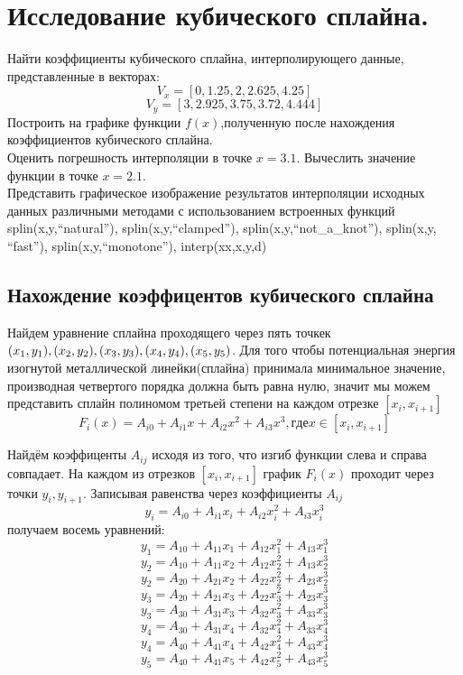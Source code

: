 \documentclass[russian,utf8,nocolumnxxxi,nocolumnxxxii]{eskdtext}
\begin{document}

\newpage
\section{Исследование кубического сплайна.}


\normalsize Найти коэффициенты кубического сплайна, интерполирующего данные, представленные в векторах:\\
$$V_{x}=[0,1.25,2,2.625,4.25]$$ 
$$V_{y}=[3,2.925,3.75,3.72,4.444]$$
Построить на графике функции $f(x)$,полученную после нахождения коэффициентов кубического сплайна. 
\\Оценить погрешность интерполяции в точке $x=3.1$. Вычеслить значение функции в точке $x=2.1$.
\\Представить графическое изображение результатов интерполяции исходных данных различными методами с использованием встроенных функций\\ splin(x,y,“natural”), splin(x,y,“clamped”), splin(x,y,“not\_a\_knot”), splin(x,y, “fast”), splin(x,y,“monotone”), interp(xx,x,y,d)

\subsection{Нахождение коэффицентов кубического сплайна}

\normalsize Найдем уравнение сплайна проходящего через пять точкек $(x_1, y_1),\\
(x_2, y_2), (x_3, y_3), (x_4, y_4), (x_5, y_5) $. Для того чтобы потенциальная энергия изогнутой
металлической линейки(сплайна) принимала минимальное значение,
производная четвертого порядка должна быть равна нулю, значит мы
можем представить сплайн полиномом третьей степени на каждом отрезке
$[x_i, x_{i+1}]$
$$F_i(x) = A_{i0} + A_{i1}x + A_{i2}x^2 + A_{i3}x^3, где x \in [x_i, x_{i+1}]$$

Найдём коэффиценты $A_{ij}$ исходя из того, что изгиб функции слева и справа совпадает. На каждом из отрезков $[x_i,x_{i+1}]$ график $F_i(x)$ проходит через точки $y_i,y_{i+1}$. Записывая равенства через коэффициенты $A_{ij}$
$$y_i=A_{i0}+A_{i1}x_i+A_{i2}x_i^2+A_{i3}x_i^3$$
получаем восемь уравнений:
$$y_1=A_{10}+A_{11}x_1+A_{12}x_1^2+A_{13}x_1^3$$
$$y_2=A_{10}+A_{11}x_2+A_{12}x_2^2+A_{13}x_2^3$$
$$y_2=A_{20}+A_{21}x_2+A_{22}x_2^2+A_{23}x_2^3$$
$$y_3=A_{20}+A_{21}x_3+A_{22}x_3^2+A_{23}x_3^3$$
$$y_3=A_{30}+A_{31}x_3+A_{32}x_3^2+A_{33}x_3^3$$
$$y_4=A_{30}+A_{31}x_4+A_{32}x_4^2+A_{33}x_4^3$$
$$y_4=A_{40}+A_{41}x_4+A_{42}x_4^2+A_{43}x_4^3$$
$$y_5=A_{40}+A_{41}x_5+A_{42}x_5^2+A_{43}x_5^3$$
\end{document}
